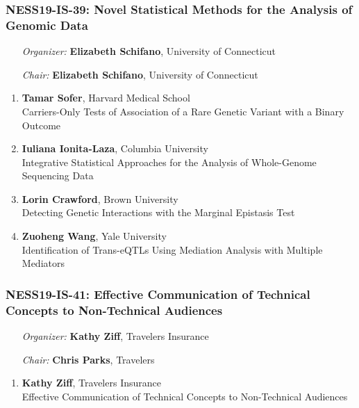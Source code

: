 \subsubsection*{NESS19-IS-39: Novel Statistical Methods for the Analysis of Genomic Data}

\begin{enumerate}[align=left]
\item [\emph{Organizer:}] \textbf{Elizabeth Schifano}, University of Connecticut
\item [\emph{Chair:}] \textbf{Elizabeth Schifano}, University of Connecticut
\end{enumerate}

\begin{enumerate}
\item \textbf{Tamar Sofer}, Harvard Medical School \\
Carriers-Only Tests of Association of a Rare Genetic Variant with a Binary Outcome
\item \textbf{Iuliana Ionita-Laza}, Columbia University \\
Integrative Statistical Approaches for the Analysis of Whole-Genome Sequencing Data
\item \textbf{Lorin Crawford}, Brown University \\
Detecting Genetic Interactions with the Marginal Epistasis Test
\item \textbf{Zuoheng Wang}, Yale University \\
Identification of Trans-eQTLs Using Mediation Analysis with Multiple Mediators
\end{enumerate}

\subsubsection*{NESS19-IS-41: Effective Communication of Technical Concepts to Non-Technical Audiences}

\begin{enumerate}[align=left]
\item [\emph{Organizer:}] \textbf{Kathy Ziff}, Travelers Insurance
\item [\emph{Chair:}] \textbf{Chris Parks},  Travelers
\end{enumerate}

\begin{enumerate}
\item \textbf{Kathy Ziff}, Travelers Insurance \\
Effective Communication of Technical Concepts to Non-Technical Audiences
\end{enumerate}


